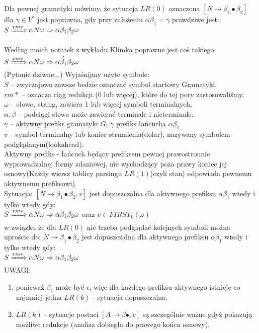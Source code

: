 \answer
{Dla pewnej gramatyki mówimy, że sytuacja $LR(0)$ oznaczona $[N \rightarrow \beta_1\bullet\beta_2]$ dla $\gamma \in V^*$ jest poprawna, gdy przy założeniu $\alpha\beta_1 = \gamma$ prawdziwe jest:}
{$S \xRightarrow{rm*} \alpha N \omega \Rightarrow \alpha \beta_1 \beta_2 \omega$}
{}
{Według moich notatek z wykładu Klimka poprawne jest coś takiego:
$S \xRightarrow{rm*} \alpha N \omega \Rightarrow \alpha \overset{*}{\beta_1} \beta_2 \omega$
\\
(Pytanie dziwne...) Wyjaśnijmy użyte symbole:
\\
$S$ -- zwyczajowo zawsze bedzie oznaczać symbol startowy Gramatyki,
\\
$rm*$ -- oznacza ciąg redukcji (0 lub więcej), które do tej pory zastosowaliśmy,
\\
$\omega$ -- słowo, string, zawiera 1 lub więcej symboli terminalnych,
\\
$\alpha, \beta$ -- podciągi słowa może zawierać terminale i nieterminale.
\\
$\gamma$ -- aktywny prefiks gramatyki $G$, $\gamma$ prefiks łańcucha $\alpha\beta_{1}$
\\
$v$ -- symbol terminalny lub koniec strumienia(dolar), nazywany symbolem podglądanym(lookahead).
\\
Aktywny prefiks - łańcuch będący prefiksem pewnej prawostronnie wyprowadzalnej formy zdaniowej, nie wychodzący poza prawy koniec jej osnowy(Każdy wiersz tablicy parsingu $LR(1)$(czyli stan) odpowiada pewnemu aktywnemu prefiksowi).
\\
Sytuacja: $[N \rightarrow \beta_{1}\bullet\beta_{2}, v]$ jest dopuszczalna dla aktywnego prefiksu $\alpha\beta_{1}$ wtedy i tylko wtedy gdy:
\\
$S \xRightarrow{rm*} \alpha N \omega \Rightarrow \alpha\beta_{1} \beta_2 \omega$ oraz $v \in FIRST_{k}(\omega)$
\\
w związku że dla $LR(0)$ nie trzeba podglądać kolejnych symboli można uprościc do:
$N \rightarrow \beta_{1}\bullet\beta_{2}$ jest dopuszczalna dla aktywnego prefiksu $\alpha\beta_{1}$ wtedy i tylko wtedy gdy:
\\
$S \xRightarrow{rm*} \alpha N \omega \Rightarrow \alpha\beta_{1} \beta_2 \omega$
\\
UWAGI:
\begin{enumerate}
\item ponieważ $\beta_1$ może być $\epsilon$, więc dla każdego prefiksu aktywnego istnieje co najmniej jedna $LR(k)$ - sytuacja dopuszczalna,
\item $LR(k)$ - sytuacje postaci $[A \rightarrow \beta\bullet, v]$ są szczególnie ważne gdyż pokazują możliwe redukcje (analiza dobiegła do prawego końca osnowy).
\end{enumerate}
}
{}


